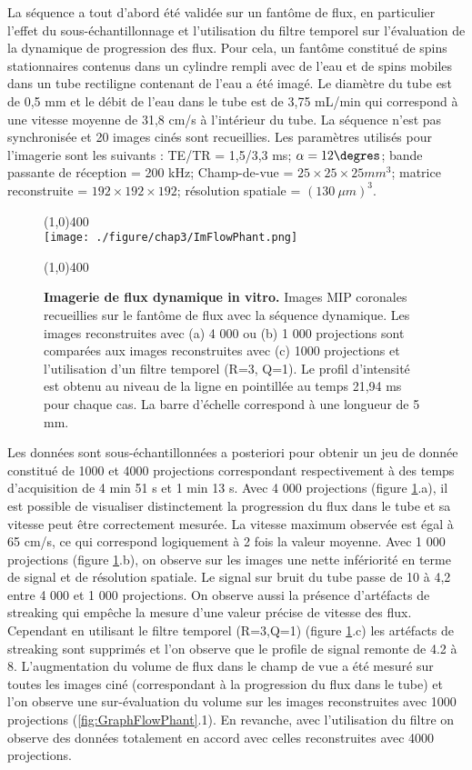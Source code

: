 La séquence a tout d'abord été validée sur un fantôme de flux, en particulier l'effet du sous-échantillonnage et l'utilisation du filtre temporel sur l'évaluation de la dynamique de progression des flux. Pour cela, un fantôme constitué de spins stationnaires contenus dans un cylindre rempli avec de l'eau et de spins mobiles dans un tube rectiligne contenant de l'eau a été imagé. Le diamètre du tube est de 0,5 mm et le débit de l'eau dans le tube est de 3,75 mL/min qui correspond à une vitesse moyenne de 31,8 cm/s à l'intérieur du tube. La séquence n'est pas synchronisée et 20 images cinés sont recueillies. Les paramètres utilisés pour l'imagerie sont les suivants : TE/TR = 1,5/3,3 ms; $\alpha=12\degres$; bande passante de réception = 200 kHz; Champ-de-vue = $25 \times 25 \times 25 mm^3$; matrice reconstruite = $192 \times 192 \times 192$; résolution spatiale = $(130 \ \mu m)^3$.
\begin{figure}[H]
\centering \line(1,0){400} \\
\texttt{[image: ./figure/chap3/ImFlowPhant.png]}
\caption[IImagerie de flux dynamique in vitro.]{\label{fig:ImFlowPhant} \textbf{Imagerie de flux dynamique in vitro.} Images MIP coronales recueillies sur le fantôme de flux avec la séquence dynamique. Les images reconstruites avec (a) 4 000 ou (b) 1 000 projections sont comparées aux images reconstruites avec (c) 1000 projections et l'utilisation d'un filtre temporel (R=3, Q=1). Le profil d'intensité est obtenu au niveau de la ligne en pointillée au temps 21,94 ms pour chaque cas. La barre d'échelle correspond à une longueur de 5 mm.}
\line(1,0){400} \\ \end{figure}

Les données sont sous-échantillonnées a posteriori pour obtenir un jeu de donnée constitué de 1000 et 4000 projections correspondant respectivement à des temps d'acquisition de 4 min 51 s et 1 min 13 s. Avec 4 000 projections (figure \ref{fig:ImFlowPhant}.a), il est possible de visualiser distinctement la progression du flux dans le tube et sa vitesse peut être correctement mesurée. La vitesse maximum observée est égal à 65 cm/s, ce qui correspond logiquement à 2 fois la valeur moyenne. Avec 1 000 projections (figure \ref{fig:ImFlowPhant}.b), on observe sur les images une nette infériorité en terme de signal et de résolution spatiale. Le signal sur bruit du tube passe de 10 à 4,2 entre 4 000 et 1 000 projections. On observe aussi la présence d'artéfacts de streaking qui empêche la mesure d'une valeur précise de vitesse des flux. Cependant en utilisant le filtre temporel (R=3,Q=1) (figure \ref{fig:ImFlowPhant}.c) les artéfacts de streaking sont supprimés et l'on observe que le profile de signal remonte de 4.2 à 8.
L'augmentation du volume de flux dans le champ de vue a été mesuré sur toutes les images ciné (correspondant à la progression du flux dans le tube) et l'on observe une sur-évaluation du volume sur les images reconstruites avec 1000 projections (\ref{fig:GraphFlowPhant}.1). En revanche, avec l'utilisation du filtre on observe des données totalement en accord avec celles reconstruites avec 4000 projections.

